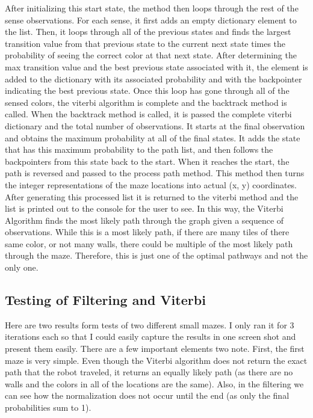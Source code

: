 \documentclass{article}
\begin{document}
After initializing this start state, the method then loops through the rest of the sense observations. For each sense, it first adds an empty dictionary element to the list. Then, it loops through all of the previous states and finds the largest transition value from that previous state to the current next state times the probability of seeing the correct color at that next state. After determining the max transition value and the best previous state associated with it, the element is added to the dictionary with its associated probability and with the backpointer indicating the best previous state. Once this loop has gone through all of the sensed colors, the viterbi algorithm is complete and the backtrack method is called. 
When the backtrack method is called, it is passed the complete viterbi dictionary and the total number of observations. It starts at the final observation and obtains the maximum probability at all of the final states. It adds the state that has this maximum probability to the path list, and then follows the backpointers from this state back to the start. When it reaches the start, the path is reversed and passed to the process path method. This method then turns the integer representations of the maze locations into actual (x, y) coordinates. After generating this processed list it is returned to the viterbi method and the list is printed out to the console for the user to see.  
In this way, the Viterbi Algorithm finds the most likely path through the graph given a sequence of observations. While this is a most likely path, if there are many tiles of there same color, or not many walls, there could be multiple of the most likely path through the maze. Therefore, this is just one of the optimal pathways and not the only one. 

\subsection{Testing of Filtering and Viterbi}
Here are two results form tests of two different small mazes. I only ran it for 3 iterations each so that I could easily capture the results in one screen shot and present them easily. There are a few important elements two note. First, the first maze is very simple. Even though the Viterbi algorithm does not return the exact path that the robot traveled, it returns an equally likely path (as there are no walls and the colors in all of the locations are the same). Also, in the filtering we can see how the normalization does not occur until the end (as only the final probabilities sum to 1). 
\end{document}

